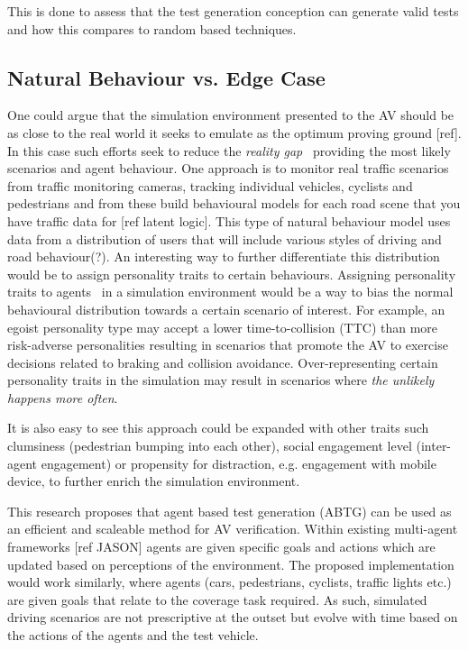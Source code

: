 \documentclass[letterpaper, 10 pt, journal, twoside]{IEEEtran}
\begin{document}
This is done to assess that the test generation conception can generate valid tests and how this compares to random based techniques.

\subsection{Natural Behaviour vs. Edge Case}
One could argue that the simulation environment presented to the AV should be as close to the real world it seeks to emulate as the optimum proving ground [ref]. In this case such efforts seek to reduce the \textit{reality gap}~\cite{Jakobi1995} providing the  most likely scenarios and agent behaviour. One approach is to monitor real traffic scenarios from traffic monitoring cameras, tracking individual vehicles, cyclists and pedestrians and from these build behavioural models for each road scene that you have traffic data for [ref latent logic]. This type of natural behaviour model uses data from a distribution of users that will include various styles of driving and road behaviour(?). An interesting way to further differentiate this distribution would be to assign personality traits to certain behaviours. Assigning personality traits to agents~\cite{Zoumpoulaki2010} in a simulation environment would be a way to bias the normal behavioural distribution towards a certain scenario of interest. For example, an egoist personality type may accept a lower time-to-collision (TTC) than more risk-adverse personalities resulting in scenarios that promote the AV to exercise decisions related to braking and collision avoidance. Over-representing certain personality traits in the simulation may result in scenarios where \textit{the unlikely happens more often}. 

It is also easy to see this approach could be expanded with other traits such clumsiness (pedestrian bumping into each other), social engagement level (inter-agent engagement) or propensity for distraction, e.g. engagement with mobile device, to further enrich the simulation environment.

This research proposes that agent based test generation (ABTG) can be used as an efficient and scaleable method for AV verification. Within existing multi-agent frameworks [ref JASON] agents are given specific goals and actions which are updated based on perceptions of the environment. The proposed implementation would work similarly, where agents (cars, pedestrians, cyclists, traffic lights etc.) are given goals that relate to the coverage task required. As such, simulated driving  scenarios are not prescriptive at the outset but evolve with time based on the actions of the agents and the test vehicle.
\end{document}
